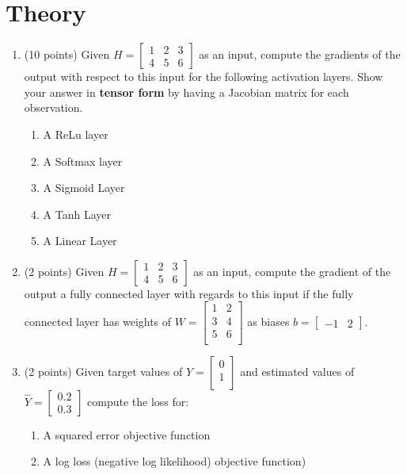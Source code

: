\documentclass[12pt]{article}
\begin{document}
\section{Theory}
\begin{enumerate}
\item (10 points) Given $H=\begin{bmatrix}1 & 2 & 3\\ 4 & 5 & 6 \end{bmatrix}$ as an input, compute the gradients of the output with respect to this input for the following activation layers.  Show your answer in \textbf{tensor form} by having a Jacobian matrix for each observation.
	\begin{enumerate}
	\item A ReLu layer
	\item A Softmax layer
	\item A Sigmoid Layer
	\item A Tanh Layer
	\item A Linear Layer
	\end{enumerate}

\item (2 points) Given $H=\begin{bmatrix}1 & 2 & 3\\ 4 & 5 & 6\end{bmatrix}$ as an input, compute the gradient of the output a fully connected layer with regards to this input if the fully connected layer has weights of $W=\begin{bmatrix}
1 & 2\\
3 & 4\\
5 & 6\\
\end{bmatrix}$  as biases $b=\begin{bmatrix}-1 & 2\end{bmatrix}$.

\item (2 points) Given target values of $Y=\begin{bmatrix}
0\\
1\\
\end{bmatrix}$ and estimated values of $\hat{Y}=\begin{bmatrix}0.2\\0.3\end{bmatrix}$ compute the loss for:
\begin{enumerate}
\item A squared error objective function
\item A log loss (negative log likelihood) objective function)
\end{enumerate}


\end{enumerate}
\end{document}
